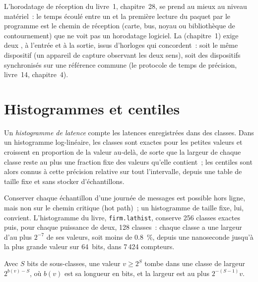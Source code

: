 L'horodatage de réception du livre~1, chapitre~28, se prend au mieux au niveau matériel~: le temps écoulé entre un 
et la première lecture du paquet par le programme est le chemin de réception (carte, bus, noyau ou bibliothèque de contournement) que ne voit pas
un horodatage logiciel. La  (chapitre~1) exige deux , à l'entrée et à la sortie, issus d'horloges qui concordent~:
soit le même dispositif (un appareil de capture observant les deux sens), soit des dispositifs synchronisés sur une référence commune
(le protocole de temps de précision, livre~14, chapitre~4).

\section{Histogrammes et centiles}

\begin{definition}\label{def:ll:measuring-latency:hist}
Un \emph{histogramme de latence} compte les latences enregistrées dans des classes. Dans un histogramme log-linéaire, les
classes sont exactes pour les petites valeurs et croissent en proportion de la valeur au-delà, de sorte que la largeur de chaque classe reste au plus une
fraction fixe des valeurs qu'elle contient~; les centiles sont alors connus à cette précision relative sur tout l'intervalle, depuis
une table de taille fixe et sans stocker d'échantillons.
\end{definition}

Conserver chaque échantillon d'une journée de messages est possible hors ligne, mais non sur le chemin critique (hot path)~; un histogramme de taille fixe, lui, convient.
L'histogramme du livre, \texttt{firm.lathist}, conserve 256 classes exactes puis, pour chaque puissance de deux, 128 classes~: chaque classe
a une largeur d'au plus $2^{-7}$ de ses valeurs, soit moins de 0.8~\%, depuis une nanoseconde jusqu'à la plus grande valeur sur 64~bits, dans 7\,424
compteurs.

\begin{proposition}\label{prop:ll:measuring-latency:precision}
Avec $S$ bits de sous-classes, une valeur $v \ge 2^S$ tombe dans une classe de largeur $2^{b(v)-S}$, où $b(v)$ est sa longueur en bits, et
la largeur est au plus $2^{-(S-1)}v$.
\end{proposition}

